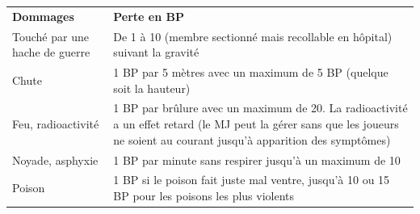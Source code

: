 \begin{frame}[b]
{\begin{minipage}[c][0.95\textheight][c]{\linewidth}
\begin{center}
\begin{tabular}{>{\raggedright\arraybackslash}p{2cm} p{6cm}}
\textbf{Dommages} & \textbf{Perte en BP}\\
Touché par une hache de guerre & De 1 à 10 (membre sectionné mais recollable en hôpital) suivant la gravité \\
Chute & 1 BP par 5 mètres avec un maximum de 5 BP (quelque soit la hauteur) \\
Feu, radioactivité & 1 BP par brûlure avec un maximum de 20. La radioactivité a un effet retard (le MJ peut la gérer sans que les joueurs ne soient au courant jusqu'à apparition des symptômes) \\
Noyade, asphyxie & 1 BP par minute sans respirer jusqu'à un maximum de 10 \\
Poison & 1 BP si le poison fait juste mal ventre, jusqu'à 10 ou 15 BP pour les poisons les plus violents \\
\end{tabular}
\end{center}

\end{minipage}
}
\end{frame}

